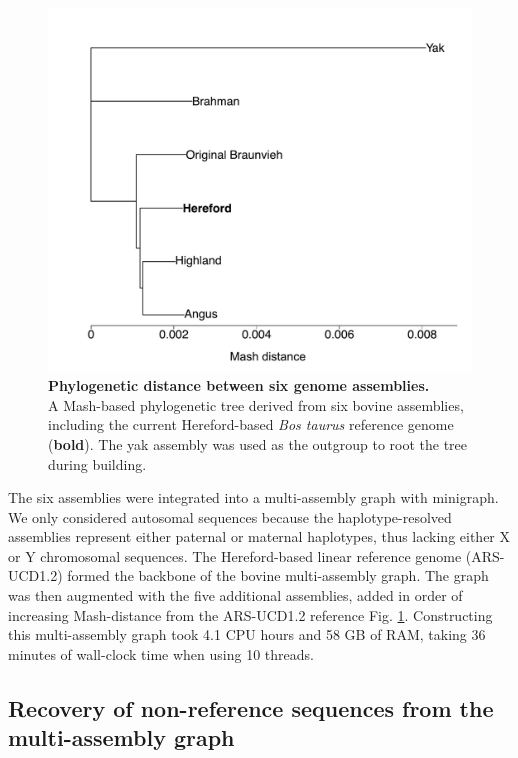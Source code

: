 \documentclass[../main.tex]{subfiles}
\begin{document}
\begin{figure}[!htb]
    \centering
    \includegraphics[width=\textwidth]{paper3/main_figure/Fig1.pdf}
        \caption[Phylogenetic bovine assemblies]{\textbf{Phylogenetic distance between six genome assemblies.} \\
        \footnotesize{A Mash-based phylogenetic tree derived from six bovine assemblies, including the current Hereford-based \emph{Bos taurus} reference genome (\textbf{bold}). The yak assembly was used as the outgroup to root the tree during building.}}
        \label{fig41:phylo}
\end{figure}


The six assemblies were integrated into a multi-assembly graph with minigraph. We only considered autosomal sequences because the haplotype-resolved assemblies represent either paternal or maternal haplotypes, thus lacking either X or Y chromosomal sequences. The Hereford-based linear reference genome (ARS-UCD1.2) formed the backbone of the bovine multi-assembly graph. The graph was then augmented with the five additional assemblies, added in order of increasing Mash-distance from the ARS-UCD1.2 reference \citep{ondov2016mash} Fig. \ref{fig41:phylo}. Constructing this multi-assembly graph took 4.1 CPU hours and 58 GB of RAM, taking 36 minutes of wall-clock time when using 10 threads.

\subsection*{Recovery of non-reference sequences from the multi-assembly graph}
\end{document}
